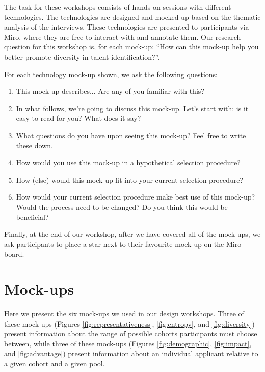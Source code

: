 The task for these workshops consists of hands-on sessions with different technologies. The technologies are designed and mocked up based on the thematic analysis of the interviews. These technologies are presented to participants via Miro, where they are free to interact with and annotate them. Our research question for this workshop is, for each mock-up: ``How can this mock-up help you better promote diversity in talent identification?''.

For each technology mock-up shown, we ask the following questions:

\begin{enumerate}
    \item This mock-up describes... Are any of you familiar with this?
    \item In what follows, we're going to discuss this mock-up. Let's start with: is it easy to read for you? What does it say? 
    \item What questions do you have upon seeing this mock-up? Feel free to write these down.
    \item How would you use this mock-up in a hypothetical selection procedure?
    \item How (else) would this mock-up fit into your current selection procedure?
    \item How would your current selection procedure make best use of this mock-up? Would the process need to be changed? Do you think this would be beneficial?
\end{enumerate}

Finally, at the end of our workshop, after we have covered all of the mock-ups, we ask participants to place a star next to their favourite mock-up on the Miro board.

\section{Mock-ups}\label{app:mockups}
Here we present the six mock-ups we used in our design workshops. Three of these mock-ups (Figures \ref{fig:representativeness}, \ref{fig:entropy}, and \ref{fig:diversity}) present information about the range of possible cohorts participants must choose between, while three of these mock-ups (Figures \ref{fig:demographic}, \ref{fig:impact}, and \ref{fig:advantage}) present information about an individual applicant relative to a given cohort and a given pool.

